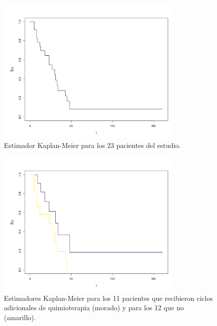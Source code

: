 \documentclass[11pt,a4paper]{article}
\begin{document}
 \begin{figure}[htb]
\centering\includegraphics[width=9cm]{km1.png}
\caption{Estimador Kaplan-Meier para los 23 pacientes del estudio.}
\label{fig:km1}
\end{figure}

\begin{figure}[htb]
\centering\includegraphics[width=9cm]{km2.png}
\caption{Estimadores Kaplan-Meier para los 11 pacientes que recibieron ciclos adicionales de quimioterapia (morado) y para los 12 que no (amarillo).}
\label{fig:km2}
\end{figure}

\clearpage
\end{document}
